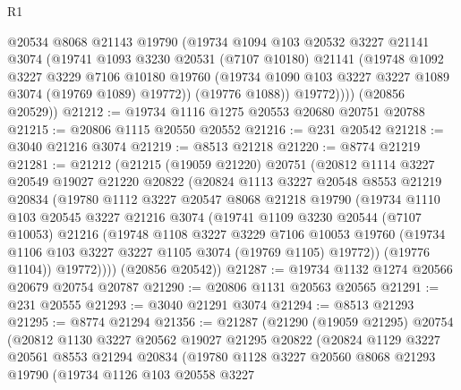 \begin{lexlean}{R1}
\begin{coremodule}
            @20534
            @8068
            @21143
            @19790
            (@19734
              @1094
              @103
              @20532
              @3227
              @21141
              @3074
              (@19741
                @1093
                @3230
                @20531
                (@7107 @10180)
                @21141
                (@19748
                  @1092
                  @3227
                  @3229
                  @7106
                  @10180
                  @19760
                  (@19734 @1090 @103 @3227 @3227 @1089 @3074 (@19769 @1089) @19772))
                (@19776 @1088))
              @19772))))
      (@20856 @20529))
@21212 := @19734 @1116 @1275 @20553 @20680 @20751 @20788
@21215 := @20806 @1115 @20550 @20552
@21216 := @231 @20542
@21218 := @3040 @21216 @3074
@21219 := @8513 @21218
@21220 := @8774 @21219
@21281 := @21212
    (@21215
      (@19059 @21220)
      @20751
      (@20812
        @1114
        @3227
        @20549
        @19027
        @21220
        @20822
        (@20824
          @1113
          @3227
          @20548
          @8553
          @21219
          @20834
          (@19780
            @1112
            @3227
            @20547
            @8068
            @21218
            @19790
            (@19734
              @1110
              @103
              @20545
              @3227
              @21216
              @3074
              (@19741
                @1109
                @3230
                @20544
                (@7107 @10053)
                @21216
                (@19748
                  @1108
                  @3227
                  @3229
                  @7106
                  @10053
                  @19760
                  (@19734 @1106 @103 @3227 @3227 @1105 @3074 (@19769 @1105) @19772))
                (@19776 @1104))
              @19772))))
      (@20856 @20542))
@21287 := @19734 @1132 @1274 @20566 @20679 @20754 @20787
@21290 := @20806 @1131 @20563 @20565
@21291 := @231 @20555
@21293 := @3040 @21291 @3074
@21294 := @8513 @21293
@21295 := @8774 @21294
@21356 := @21287
    (@21290
      (@19059 @21295)
      @20754
      (@20812
        @1130
        @3227
        @20562
        @19027
        @21295
        @20822
        (@20824
          @1129
          @3227
          @20561
          @8553
          @21294
          @20834
          (@19780
            @1128
            @3227
            @20560
            @8068
            @21293
            @19790
            (@19734
              @1126
              @103
              @20558
              @3227

\end{coremodule}
\end{lexlean}
